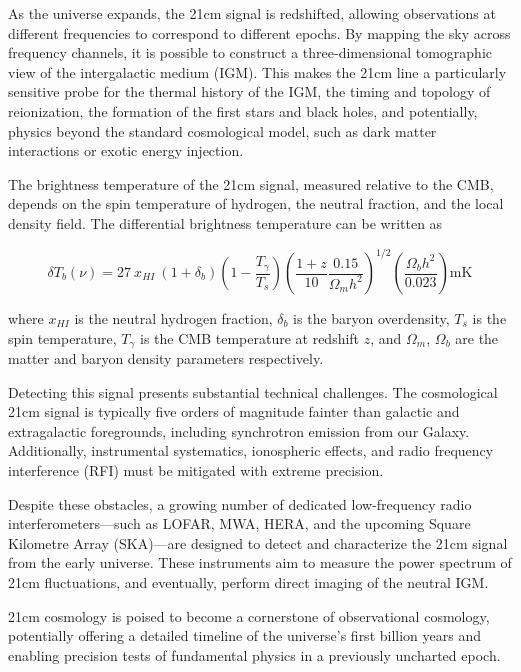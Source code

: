 \documentclass[floats,floatfix,showpacs,amssymb,prd,superscriptaddress,nofootinbib]{revtex4-2} %
\begin{document}
As the universe expands, the 21cm signal is redshifted, allowing observations at different frequencies to correspond to different epochs. By mapping the sky across frequency channels, it is possible to construct a three-dimensional tomographic view of the intergalactic medium (IGM). This makes the 21cm line a particularly sensitive probe for the thermal history of the IGM, the timing and topology of reionization, the formation of the first stars and black holes, and potentially, physics beyond the standard cosmological model, such as dark matter interactions or exotic energy injection.

The brightness temperature of the 21cm signal, measured relative to the CMB, depends on the spin temperature of hydrogen, the neutral fraction, and the local density field. The differential brightness temperature can be written as

\begin{equation}
    \delta T_b (\nu) = 27 \ x_{HI} \ (1 + \delta_b) \left(1 - \frac{T_\gamma}{T_s} \right) \left(\frac{1 + z}{10} \frac{0.15}{\Omega_m h^2} \right)^{1/2} \left( \frac{\Omega_b h^2}{0.023} \right) \text{mK}
\end{equation}

\noindent where $x_{HI}$ is the neutral hydrogen fraction, $\delta_b$ is the baryon overdensity, $T_s$ is the spin temperature, $T_\gamma$ is the CMB temperature at redshift $z$, and $\Omega_m$, $\Omega_b$ are the matter and baryon density parameters respectively.

Detecting this signal presents substantial technical challenges. The cosmological 21cm signal is typically five orders of magnitude fainter than galactic and extragalactic foregrounds, including synchrotron emission from our Galaxy. Additionally, instrumental systematics, ionospheric effects, and radio frequency interference (RFI) must be mitigated with extreme precision.

Despite these obstacles, a growing number of dedicated low-frequency radio interferometers—such as LOFAR, MWA, HERA, and the upcoming Square Kilometre Array (SKA)—are designed to detect and characterize the 21cm signal from the early universe. These instruments aim to measure the power spectrum of 21cm fluctuations, and eventually, perform direct imaging of the neutral IGM.

21cm cosmology is poised to become a cornerstone of observational cosmology, potentially offering a detailed timeline of the universe's first billion years and enabling precision tests of fundamental physics in a previously uncharted epoch.
\end{document}
